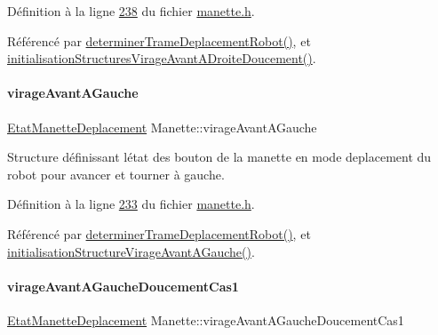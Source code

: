 Définition à la ligne \hyperlink{manette_8h_source_l00238}{238} du fichier \hyperlink{manette_8h_source}{manette.\+h}.



Référencé par \hyperlink{manette_8cpp_source_l00341}{determiner\+Trame\+Deplacement\+Robot()}, et \hyperlink{manette_8cpp_source_l00242}{initialisation\+Structures\+Virage\+Avant\+A\+Droite\+Doucement()}.

\mbox{\label{class_manette_a3f44a6304ed3b17176636bad8f2220db}} 
\paragraph{\texorpdfstring{virage\+Avant\+A\+Gauche}{virageAvantAGauche}}
{\footnotesize\ttfamily \hyperlink{struct_etat_manette_deplacement}{Etat\+Manette\+Deplacement} Manette\+::virage\+Avant\+A\+Gauche\hspace{0.3cm}{\ttfamily [private]}}



Structure définissant l\textquotesingle{}état des bouton de la manette en mode deplacement du robot pour avancer et tourner à gauche. 



Définition à la ligne \hyperlink{manette_8h_source_l00233}{233} du fichier \hyperlink{manette_8h_source}{manette.\+h}.



Référencé par \hyperlink{manette_8cpp_source_l00341}{determiner\+Trame\+Deplacement\+Robot()}, et \hyperlink{manette_8cpp_source_l00205}{initialisation\+Structure\+Virage\+Avant\+A\+Gauche()}.

\mbox{\label{class_manette_a0fe6d52d8ca1060a2a3c534847824c09}} 
\paragraph{\texorpdfstring{virage\+Avant\+A\+Gauche\+Doucement\+Cas1}{virageAvantAGaucheDoucementCas1}}
{\footnotesize\ttfamily \hyperlink{struct_etat_manette_deplacement}{Etat\+Manette\+Deplacement} Manette\+::virage\+Avant\+A\+Gauche\+Doucement\+Cas1\hspace{0.3cm}{\ttfamily [private]}}



